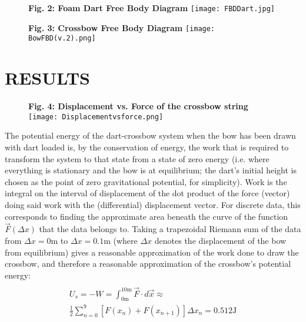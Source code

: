 \documentclass[twocolumn, 10pt]{article}
\begin{document}
 \begin{figure}
    \centering
    \textbf{Fig. 2: Foam Dart Free Body Diagram}
    \texttt{[image: FBDDart.jpg]}
\end{figure}

 \begin{figure}[h]
    \centering
    \textbf{Fig. 3: Crossbow Free Body Diagram}
    \texttt{[image: BowFBD(v.2).png]}
\end{figure}

\section*{RESULTS}
\begin{figure} [h]
    \centering
    \textbf{Fig. 4: Displacement vs. Force of the crossbow string}
    \texttt{[image: Displacementvsforce.png]}
\end{figure}
The potential energy of the dart-crossbow system when the bow has been drawn with dart loaded is, by the conservation of energy, the work that is required to transform the system to that state from a state of zero energy (i.e. where everything is stationary and the bow is at equilibrium; the dart’s initial height is chosen as the point of zero gravitational potential, for simplicity). Work is the integral on the interval of displacement of the dot product of the force (vector) doing said work with the (differential) displacement vector. For discrete data, this corresponds to finding the approximate area beneath the curve of the function $\vec{F}(\Delta x)$ that the data belongs to. Taking a trapezoidal Riemann sum of the data from $\Delta x=0\text{m}$ to $\Delta x=0.1\text{m}$ (where $\Delta x$ denotes the displacement of the bow from equilibrium) gives a reasonable approximation of the work done to draw the crossbow, and therefore a reasonable approximation of the crossbow’s potential energy:
\vspace{-10pt}
\begin{gather*}
	\\U_s=-W=\int_{0\text{m}}^{10\text{m}} \vec{F} \cdot d\vec{x} \approx
\\ \frac{1}{2}\sum_{n=0}^{9} [F(x_n)+F(x_{n+1})]\Delta x_n = 0.512 \text{J}
\end{gather*}
\end{document}
